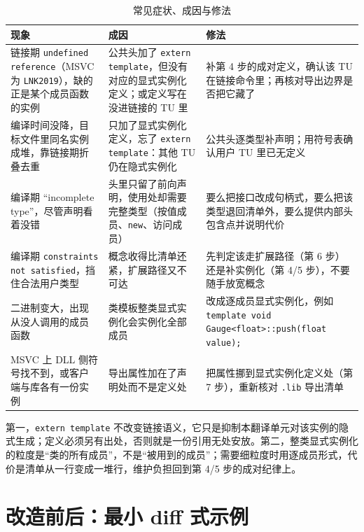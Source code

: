 \documentclass[12pt,a4paper,fontset=fandol]{ctexbook}
\newcommand{\kw}[1]{\texttt{#1}}
\begin{document}
\begin{longtable}{>{\raggedright\arraybackslash}p{} >{\raggedright\arraybackslash}p{} >{\raggedright\arraybackslash}p{}}
\caption{常见症状、成因与修法} \\
\toprule
\textbf{现象} & \textbf{成因} & \textbf{修法} \\
\midrule
\endhead
\bottomrule
\endfoot
链接期 \kw{undefined reference}（MSVC 为 \kw{LNK2019}），缺的正是某个成员函数的实例
& 公共头加了 \kw{extern template}，但没有对应的显式实例化定义；或定义写在没进链接的 TU 里
& 补第 4 步的成对定义，确认该 TU 在链接命令里；再核对导出边界是否把它藏了 \\
\addlinespace
编译时间没降，目标文件里同名实例成堆，靠链接期折叠去重
& 只加了显式实例化定义，忘了 \kw{extern template}：其他 TU 仍在隐式实例化
& 公共头逐类型补声明；用符号表确认用户 TU 里已无定义 \\
\addlinespace
编译期 “incomplete type”，尽管声明看着没错
& 头里只留了前向声明，使用处却需要完整类型（按值成员、\kw{new}、访问成员）
& 要么把接口改成句柄式，要么把该类型退回清单外，要么提供内部头包含点并说明代价 \\
\addlinespace
编译期 \kw{constraints not satisfied}，挡住合法用户类型
& 概念收得比清单还紧，扩展路径又不可达
& 先判定该走扩展路径（第 6 步）还是补实例化（第 4/5 步），不要随手放宽概念 \\
\addlinespace
二进制变大，出现从没人调用的成员函数
& 类模板整类显式实例化会实例化全部成员
& 改成逐成员显式实例化，例如 \kw{template void Gauge<float>::push(float value);} \\
\addlinespace
MSVC 上 DLL 侧符号找不到，或客户端与库各有一份实例
& 导出属性加在了声明处而不是定义处
& 把属性挪到显式实例化定义处（第 7 步），重新核对 \texttt{.lib} 导出清单 \\
\bottomrule
\end{longtable}

\begin{note}[title={两条容易记反的语义}]
第一，\kw{extern template} 不改变链接语义，它只是抑制本翻译单元对该实例的隐式生成；定义必须另有出处，否则就是一份引用无处安放。第二，整类显式实例化的粒度是“类的所有成员”，不是“被用到的成员”；需要细粒度时用逐成员形式，代价是清单从一行变成一堆行，维护负担回到第 4/5 步的成对纪律上。
\end{note}

\section{改造前后：最小 diff 式示例}
\end{document}

